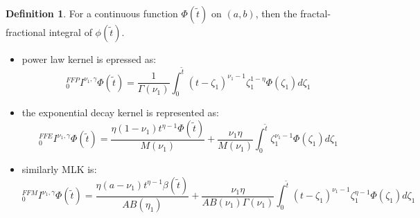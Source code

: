 \documentclass{article}
\theoremstyle{plain}
\theoremstyle{definition}
\newtheorem{definition}{Definition}[section]
\numberwithin{equation}{section}
\begin{document}
\begin{definition}\label{def2-2}
For a continuous function $\Phi(\tilde{t})$ on $(a,b)$, then the fractal-fractional
integral of $\phi(\tilde{t})$.
\begin{itemize}
    \item power law kernel is epressed as:
\begin{equation}\label{eq2-5}
    _0^{FFP}I^{\nu_1, \gamma}  \Phi (\tilde{t}) = \frac{1}{\Gamma ( \nu_1)} \int_0^{\tilde{t}} (t-\zeta_1)^{\nu_1-1} \zeta_1^{1-\eta} \Phi (\zeta_1) d\zeta_1
\end{equation}
\item the exponential decay kernel is represented as:
\begin{equation}\label{eq2-6}
    _0^{FFE}I^{\nu_1, \gamma}  \Phi (\tilde{t}) = \frac{\eta (1-\nu_1) t^{\eta -1} \Phi(\tilde{t})}{M(\nu_1)} +  \frac{\nu_1 \eta}{M (\nu_1)}  \int_0^{\tilde{t}} \zeta_1^{\nu_1-1} \Phi (\zeta_1) d\zeta_1    
\end{equation}
\item similarly MLK is:
\begin{equation}\label{eq2-7}
    _0^{FFM}I^{\nu_1, \gamma}  \Phi (\tilde{t}) = \frac{\eta (a-\nu_1) t^{\eta -1} \beta(\tilde{t})}{AB (\eta_1)} + \frac{ \nu_1 \eta }{AB(\nu_1) \Gamma(\nu_1) } \int_0^{\tilde{t}} (t- \zeta_1)^{\nu_1 -1 } \zeta_1^{\eta-1} \Phi (\zeta_1)   d\zeta_1    
\end{equation}
\end{itemize}
\end{definition}
\end{document}
